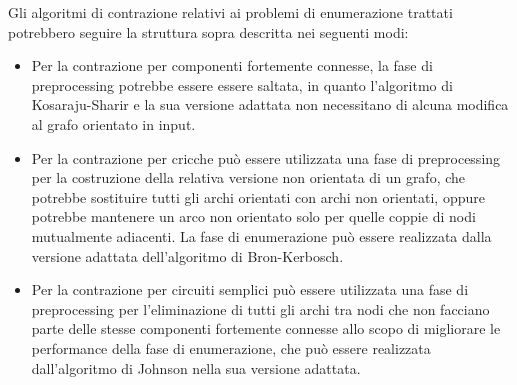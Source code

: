 Gli algoritmi di contrazione relativi ai problemi di enumerazione trattati potrebbero seguire la struttura sopra
descritta nei seguenti modi:
\begin{itemize}
    \item Per la contrazione per componenti fortemente connesse, la fase di preprocessing potrebbe essere
    essere saltata, in quanto l'algoritmo di Kosaraju-Sharir e la sua versione adattata non necessitano di alcuna
    modifica al grafo orientato in input.
    \item Per la contrazione per cricche può essere utilizzata una fase di preprocessing per la costruzione
    della relativa versione non orientata di un grafo, che potrebbe sostituire tutti gli archi orientati con
    archi non orientati, oppure potrebbe mantenere un arco non orientato solo per quelle coppie di nodi
    mutualmente adiacenti.
    La fase di enumerazione può essere realizzata dalla versione adattata dell'algoritmo di Bron-Kerbosch.
    \item Per la contrazione per circuiti semplici pu\`o essere utilizzata una fase di preprocessing per
    l'eliminazione di tutti gli archi tra nodi che non facciano parte delle stesse componenti fortemente connesse
    allo scopo di migliorare le performance della fase di enumerazione, che può essere realizzata dall'algoritmo
    di Johnson nella sua versione adattata.
\end{itemize}